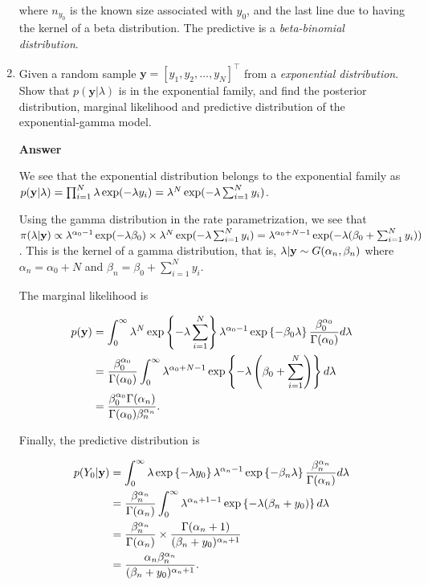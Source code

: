 \begin{enumerate}[leftmargin=*]
where $n_{y_0}$ is the known size associated with $y_0$, and the last line due to having the kernel of a beta distribution. The predictive is a \textit{beta-binomial distribution}.

\item Given a random sample $\mathbf{y}=[y_1,y_2,\dots,y_N]^{\top}$ from a \textit{exponential distribution}. Show that $p(\mathbf{y}|\lambda)$ is in the exponential family, and find the posterior distribution, marginal likelihood and predictive distribution of the exponential-gamma model.

\textbf{Answer}

We see that the exponential distribution belongs to the exponential family as $p({\bf{y}}|\lambda)=\prod_{i=1}^N\lambda\exp(-\lambda y_i)=\lambda^N\exp(-\lambda\sum_{i=1}^N y_i)$.

Using the gamma distribution in the rate parametrization, we see that $\pi(\lambda|{\bf{y}})\propto \lambda^{\alpha_0-1}\exp(-\lambda\beta_0)\times \lambda^N\exp(-\lambda\sum_{i=1}^N y_i)=\lambda^{\alpha_0+N-1}\exp(-\lambda(\beta_0+\sum_{i=1}^N y_i))$. This is the kernel of a gamma distribution, that is, $\lambda|{\bf{y}}\sim G(\alpha_n,\beta_n)$ where $\alpha_n=\alpha_0+N$ and $\beta_n=\beta_0+\sum_{i=1}^N y_i$.

The marginal likelihood is

\begin{align*}
	p({\bf{y}})&=\int_0^{\infty}\lambda^N \exp\left\{-\lambda\sum_{i=1}^N\right\}\lambda^{\alpha_0-1}\exp\left\{-\beta_0\lambda\right\}\frac{\beta_0^{\alpha_0}}{\Gamma(\alpha_0)}d\lambda\\
	&=\frac{\beta_0^{\alpha_0}}{\Gamma(\alpha_0)}\int_0^{\infty}\lambda^{\alpha_0+N-1} \exp\left\{-\lambda\left(\beta_0+\sum_{i=1}^N\right)\right\}d\lambda\\
	&=\frac{\beta_0^{\alpha_0}\Gamma(\alpha_n)}{\Gamma(\alpha_0)\beta_n^{\alpha_n}}.
\end{align*} 

Finally, the predictive distribution is

\begin{align*}
	p(Y_0|{\bf{y}})&=\int_0^{\infty}\lambda \exp\left\{-\lambda y_0\right\}\lambda^{\alpha_n-1}\exp\left\{-\beta_n\lambda\right\}\frac{\beta_n^{\alpha_n}}{\Gamma(\alpha_n)}d\lambda\\
	&=\frac{\beta_n^{\alpha_n}}{\Gamma(\alpha_n)}\int_0^{\infty}\lambda^{\alpha_n+1-1}\exp\left\{-\lambda(\beta_n+y_0)\right\}d\lambda\\
	&=\frac{\beta_n^{\alpha_n}}{\Gamma(\alpha_n)}\times \frac{\Gamma(\alpha_n+1)}{(\beta_n+y_0)^{\alpha_n+1}}\\
	&=\frac{\alpha_n\beta_n^{\alpha_n}}{(\beta_n+y_0)^{\alpha_n+1}}.
\end{align*} 


\end{enumerate}
